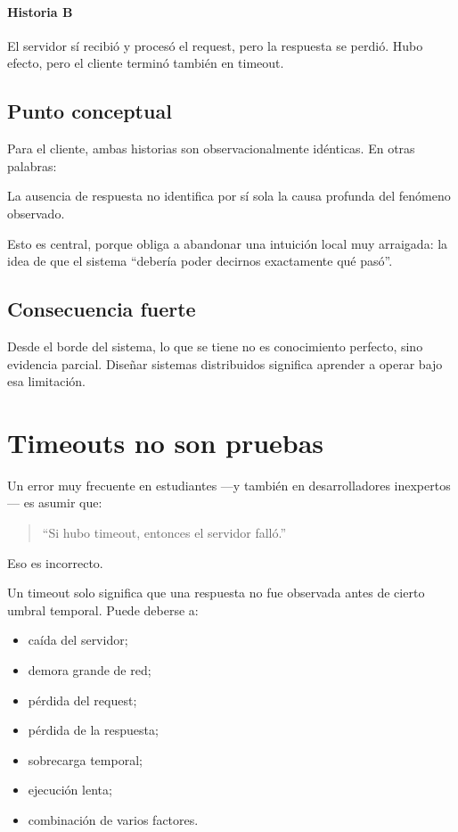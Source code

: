 \documentclass[variant=apuntes,cover=institutional,mode=screen]{ua-engineering-v6-article}
\begin{document}
\paragraph{Historia B}
El servidor sí recibió y procesó el request, pero la respuesta se perdió.
Hubo efecto, pero el cliente terminó también en timeout.

\subsection{Punto conceptual}\label{subsec:punto-conceptual}

Para el cliente, ambas historias son observacionalmente idénticas.
En otras palabras:

\begin{uakeybox}
La ausencia de respuesta no identifica por sí sola la causa profunda del fenómeno observado.
\end{uakeybox}

Esto es central, porque obliga a abandonar una intuición local muy arraigada: la idea de que el sistema “debería poder decirnos exactamente qué pasó”.

\subsection{Consecuencia fuerte}\label{subsec:consecuencia-fuerte}

Desde el borde del sistema, lo que se tiene no es conocimiento perfecto, sino evidencia parcial.
Diseñar sistemas distribuidos significa aprender a operar bajo esa limitación.

\section{Timeouts no son pruebas}\label{sec:timeouts-no-son-pruebas}

Un error muy frecuente en estudiantes —y también en desarrolladores inexpertos— es asumir que:

\begin{quote}
“Si hubo timeout, entonces el servidor falló.”
\end{quote}

Eso es incorrecto.

Un timeout solo significa que una respuesta no fue observada antes de cierto umbral temporal.
Puede deberse a:

\begin{itemize}
\item caída del servidor;
\item demora grande de red;
\item pérdida del request;
\item pérdida de la respuesta;
\item sobrecarga temporal;
\item ejecución lenta;
\item combinación de varios factores.
\end{itemize}
\end{document}
